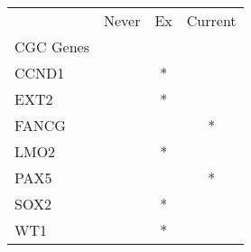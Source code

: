\begin{tabular}{lccc}
\toprule
{} & Never & Ex & Current \\
CGC Genes &       &    &         \\
\midrule
CCND1     &       &  * &         \\
EXT2      &       &  * &         \\
FANCG     &       &    &       * \\
LMO2      &       &  * &         \\
PAX5      &       &    &       * \\
SOX2      &       &  * &         \\
WT1       &       &  * &         \\
\bottomrule
\end{tabular}
